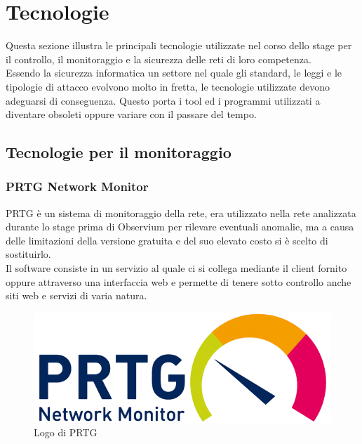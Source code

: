 \documentclass[Tesi.tex]{subfiles}
\begin{document}
\chapter{Tecnologie}

Questa sezione illustra le principali tecnologie utilizzate nel corso dello stage per il controllo, il monitoraggio e la sicurezza delle reti di loro competenza. \\
Essendo la sicurezza informatica un settore nel quale gli standard, le leggi e le tipologie di attacco evolvono molto in fretta, le tecnologie utilizzate devono adeguarsi di conseguenza. Questo porta i tool ed i programmi utilizzati a diventare obsoleti oppure variare con il passare del tempo.

\section{Tecnologie per il monitoraggio}
\subsection{PRTG Network Monitor}
PRTG è un sistema di monitoraggio della rete, era utilizzato nella rete analizzata durante lo stage prima di Observium per rilevare eventuali anomalie, ma a causa delle limitazioni della versione gratuita e del suo elevato costo si è scelto di sostituirlo.\\
Il software consiste in un servizio al quale ci si collega mediante il client fornito oppure attraverso una interfaccia web e permette di tenere sotto controllo anche siti web e servizi di varia natura.
\begin{figure}[H]
	\centering
	\includegraphics[width=0.5\linewidth]{"images/logo/PRTG_logo"}
	\caption{Logo di PRTG}
	\label{fig:Logo di PRTG}
\end{figure}
\end{document}
